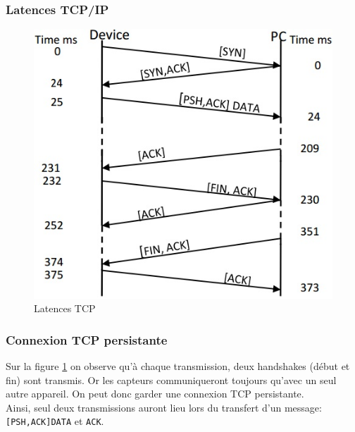 \begin{frame}
 \frametitle{Latences TCP/IP}
 \begin{figure}
  \centering
  \includegraphics[scale=0.5]{figures/TCPlatences.jpg}
  \caption{Latences TCP}
  \label{tcplatences}
 \end{figure}
\end{frame}
\begin{frame}
 \frametitle{Connexion TCP persistante}
 Sur la figure \ref{tcplatences} on observe qu'à chaque transmission, deux handshakes (début et fin) sont transmis. Or les capteurs communiqueront toujours qu'avec un seul autre appareil.
 On peut donc garder une connexion TCP persistante.\\
 \vspace{5mm}
 Ainsi, seul deux transmissions auront lieu lors du transfert d'un message: \texttt{[PSH,ACK]DATA} et \texttt{ACK}.
\end{frame}
